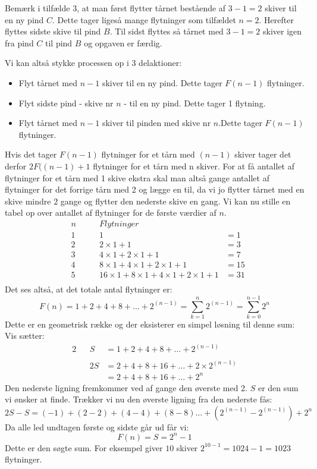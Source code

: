 Bemærk i tilfælde \(3\), at man først flytter tårnet bestående af \(3-1=2\)
skiver til en ny pind \(C\). Dette tager ligeså mange flytninger som
tilfældet \(n=2\). Herefter flyttes sidste skive til pind \(B\). Til sidst
flyttes så tårnet med \(3-1=2\) skiver igen fra pind \(C\) til pind \(B\)
og opgaven er færdig.

Vi kan altså stykke processen op i 3 delaktioner:
\begin{itemize}
\item Flyt tårnet med \(n-1\) skiver til en ny pind. Dette tager \(F(n-1)\)
flytninger.
\item Flyt sidste pind - skive nr \(n\) - til en ny pind. Dette tager 1
flytning.
\item Flyt tårnet med  \(n-1\) skiver til pinden med skive nr \(n\).Dette
tager \(F(n-1)\) flytninger.
\end{itemize}

Hvis det tager \(F(n-1)\) flytninger for et tårn med \((n-1)\) skiver tager
det derfor \(2F((n-1)+1\) flytninger for et tårn med n skiver.  For at få
antallet af flytninger for et tårn med 1 skive ekstra skal man altså gange
antallet af flytninger for det forrige tårn med 2 og lægge en til, da vi jo
flytter tårnet med en skive mindre \(2\) gange og flytter den nederste
skive en gang. Vi kan nu stille en tabel op over antallet af flytninger for
de første værdier af \(n\).
\begin{align*}
&n \qquad &Flytninger&\ \\
&1  &1&=1\\
&2  &2 \times 1+1&=3\\
&3 &4 \times 1 + 2\times 1 + 1&=7\\
&4 &8 \times 1 + 4 \times 1+ 2 \times 1 +1&=15\\
&5 &16 \times 1 +8 \times 1 + 4\times 1 + 2 \times 1 +1&=31\\
\end{align*}
Det ses altså, at det totale antal flytninger er:
\begin{equation}
F(n) = 1+2+4+8+\ldots + 2^{(n-1)} = \sum_{k=1}^{n} 2^{(n-1)} = \sum_{k=0}^
{n-1}2^n
\end{equation}
Dette er en geometrisk række og der eksisterer en simpel løsning til denne
sum:
Vis sætter:
\begin{alignat*}{2}
&&S&=1+2+4+8+\ldots+2^{(n-1)}\\\\
&&2S&=2+4+8+16+\ldots+2\times 2^{(n-1)}\\
&&&=2+4+8+16+\ldots+2^n
\end{alignat*}
Den nederste ligning fremkommer ved af gange den øverste med 2. \(S\) er
den sum vi ønsker at finde. Trækker vi nu den øverste ligning fra den
nederste fås:
\[2S-S=(-1)+(2-2)+(4-4)+(8-8)\ldots+(2^{(n-1)}-2^{(n-1)})+2^n\]
Da alle led undtagen første og sidste går ud får vi:
\[F(n)=S=2^n-1\]
Dette er den søgte sum. For eksempel giver \(10\) skiver
\(2^{10-1}=1024-1=1023\) flytninger.

